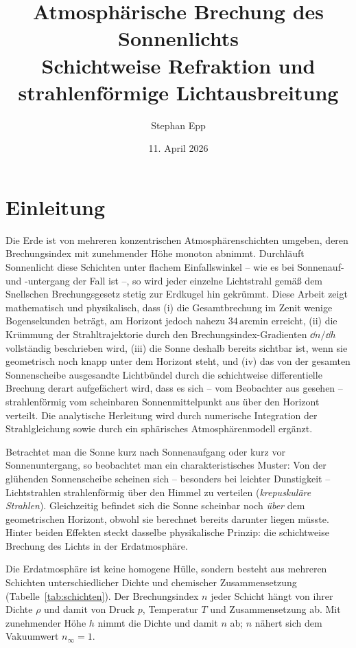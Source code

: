 \documentclass[12pt,a4paper]{article}
\title{{\bfseries Atmosphärische Brechung des Sonnenlichts}\\ 
\Large Schichtweise Refraktion und strahlenförmige Lichtausbreitung}
\author{Stephan Epp}
\date{11. April 2026}
\providecommand{\ang}[1]{\ensuremath{#1\,\mathrm{arcmin}}}
\begin{document}

\maketitle
\tableofcontents
\newpage

\section{Einleitung}
Die Erde ist von mehreren konzentrischen Atmosphärenschichten umgeben,
deren Brechungsindex mit zunehmender Höhe monoton abnimmt.
Durchläuft Sonnenlicht diese Schichten unter flachem Einfallswinkel --
wie es bei Sonnenauf- und -untergang der Fall ist --,
so wird jeder einzelne Lichtstrahl gemäß dem Snellschen Brechungsgesetz
stetig zur Erdkugel hin gekrümmt.
Diese Arbeit zeigt mathematisch und physikalisch,
dass (i) die Gesamtbrechung im Zenit wenige Bogensekunden beträgt,
am Horizont jedoch nahezu $\ang{34}$ erreicht,
(ii) die Krümmung der Strahltrajektorie durch den Brechungsindex-Gradienten
$\dd n/\dd h$ vollständig beschrieben wird,
(iii) die Sonne deshalb bereits sichtbar ist, wenn sie geometrisch
noch knapp unter dem Horizont steht, und
(iv) das von der gesamten Sonnenscheibe ausgesandte Lichtbündel
durch die schichtweise differentielle Brechung derart aufgefächert wird,
dass es sich -- vom Beobachter aus gesehen -- strahlenförmig
vom scheinbaren Sonnenmittelpunkt aus über den Horizont verteilt.
Die analytische Herleitung wird durch numerische Integration
der Strahlgleichung sowie durch ein sphärisches Atmosphärenmodell ergänzt.

Betrachtet man die Sonne kurz nach Sonnenaufgang oder kurz vor
Sonnenuntergang,
so beobachtet man ein charakteristisches Muster:
Von der glühenden Sonnenscheibe scheinen sich -- besonders bei
leichter Dunstigkeit -- Lichtstrahlen strahlenförmig über den
Himmel zu verteilen (\emph{krepuskuläre Strahlen}).
Gleichzeitig befindet sich die Sonne scheinbar noch \emph{über} dem
geometrischen Horizont, obwohl sie berechnet bereits darunter
liegen müsste.
Hinter beiden Effekten steckt dasselbe physikalische Prinzip:
die schichtweise Brechung des Lichts in der Erdatmosphäre.

Die Erdatmosphäre ist keine homogene Hülle, sondern besteht
aus mehreren Schichten unterschiedlicher Dichte und chemischer
Zusammensetzung (Tabelle~\ref{tab:schichten}).
Der Brechungsindex $n$ jeder Schicht hängt von ihrer Dichte $\rho$
und damit von Druck $p$, Temperatur $T$ und Zusammensetzung ab.
Mit zunehmender Höhe $h$ nimmt die Dichte und damit $n$ ab;
$n$ nähert sich dem Vakuumwert $n_{\infty} = 1$.
\end{document}
